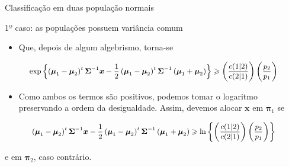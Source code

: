 \documentclass[
  ignorenonframetext,
  aspectratio=169,
]{beamer}
\providecommand{\tightlist}{%
  \setlength{\itemsep}{0pt}\setlength{\parskip}{0pt}}
\begin{document}
\begin{frame}{Classificação em duas população normais}
\label{classificauxe7uxe3o-em-duas-populauxe7uxe3o-normais-2}
\begin{block}{1º caso: as populações possuem variância comum}
\label{uxba-caso-as-populauxe7uxf5es-possuem-variuxe2ncia-comum-2}
\begin{itemize}
\tightlist
\item
  Que, depois de algum algebrismo, torna-se
\end{itemize}

\[\small \exp\left\lbrace \left( \boldsymbol{\mu}_1 - \boldsymbol{\mu}_2\right) ^t \boldsymbol{\Sigma}^{-1}\boldsymbol{x} - \dfrac{1}{2} \left( \boldsymbol{\mu}_1 - \boldsymbol{\mu}_2\right) ^t \boldsymbol{\Sigma}^{-1} \left( \boldsymbol{\mu}_1 + \boldsymbol{\mu}_2\right) \right\rbrace \geqslant \left( \dfrac{c(1|2)}{c(2|1)}\right) \left( \dfrac{p_2}{p_1}\right)\]

\begin{itemize}
\tightlist
\item
  Como ambos os termos são positivos, podemos tomar o logaritmo
  preservando a ordem da desigualdade. Assim, devemos alocar
  \(\boldsymbol{x}\) em \(\boldsymbol{\pi}_1\) se
\end{itemize}

\[\small \left( \boldsymbol{\mu}_1 - \boldsymbol{\mu}_2\right) ^t \boldsymbol{\Sigma}^{-1}\boldsymbol{x} - \dfrac{1}{2} \left( \boldsymbol{\mu}_1 - \boldsymbol{\mu}_2\right) ^t \boldsymbol{\Sigma}^{-1} \left( \boldsymbol{\mu}_1 + \boldsymbol{\mu}_2\right) \geqslant \ln \left\lbrace  \left( \dfrac{c(1|2)}{c(2|1)}\right) \left( \dfrac{p_2}{p_1}\right) \right\rbrace \]

e em \(\boldsymbol{\pi}_2\), caso contrário.
\end{block}
\end{frame}
\end{document}
